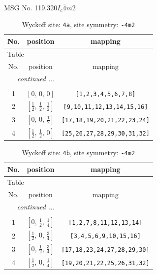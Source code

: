 \documentclass[fleqn,8pt]{jsarticle}
\begin{document}
\setcounter{MaxMatrixCols}{32}

\renewcommand{\tablename}{Table~}
\renewcommand{\figurename}{Figure~}
\begin{center}
\LARGE
MSG No. 119.320\quad$I_{c}\bar{4}m2$
\end{center}
\renewcommand{\arraystretch}{1.2}
\begin{longtable}{ccc}
\caption{Wyckoff site: {\tt 4a}, site symmetry: {\tt -4m2}}
 \\
 \hline \hline
No. & position & mapping \\ \hline \endfirsthead

\multicolumn{2}{l}{\tablename\ \thetable{}} \\
 \hline \hline
No. & position & mapping \\ \hline \endhead

 \hline \hline
\multicolumn{2}{r}{\footnotesize\it continued ...} \\ \endfoot

 \hline \hline
\multicolumn{2}{r}{} \\ \endlastfoot

1 & $\left[ 0,\, 0,\, 0 \right]$ & {\tt [1,2,3,4,5,6,7,8]} \\ \hline
2 & $\left[ \frac{1}{2},\, \frac{1}{2},\, \frac{1}{2} \right]$ & {\tt [9,10,11,12,13,14,15,16]} \\ \hline
3 & $\left[ 0,\, 0,\, \frac{1}{2} \right]$ & {\tt [17,18,19,20,21,22,23,24]} \\ \hline
4 & $\left[ \frac{1}{2},\, \frac{1}{2},\, 0 \right]$ & {\tt [25,26,27,28,29,30,31,32]} \\
\end{longtable}
\renewcommand{\arraystretch}{1.2}
\begin{longtable}{ccc}
\caption{Wyckoff site: {\tt 4b}, site symmetry: {\tt -4m2}}
 \\
 \hline \hline
No. & position & mapping \\ \hline \endfirsthead

\multicolumn{2}{l}{\tablename\ \thetable{}} \\
 \hline \hline
No. & position & mapping \\ \hline \endhead

 \hline \hline
\multicolumn{2}{r}{\footnotesize\it continued ...} \\ \endfoot

 \hline \hline
\multicolumn{2}{r}{} \\ \endlastfoot

1 & $\left[ 0,\, \frac{1}{2},\, \frac{1}{4} \right]$ & {\tt [1,2,7,8,11,12,13,14]} \\ \hline
2 & $\left[ \frac{1}{2},\, 0,\, \frac{3}{4} \right]$ & {\tt [3,4,5,6,9,10,15,16]} \\ \hline
3 & $\left[ 0,\, \frac{1}{2},\, \frac{3}{4} \right]$ & {\tt [17,18,23,24,27,28,29,30]} \\ \hline
4 & $\left[ \frac{1}{2},\, 0,\, \frac{1}{4} \right]$ & {\tt [19,20,21,22,25,26,31,32]} \\
\end{longtable}
\end{document}

